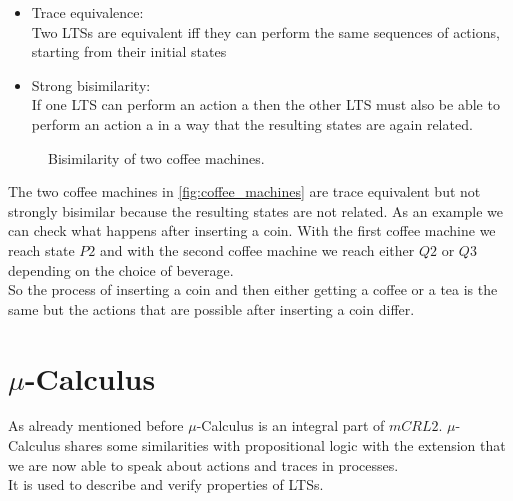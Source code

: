\documentclass{clseminar}
\begin{document}
  \begin{itemize}[noitemsep]
    \item Trace equivalence: \\
    Two LTSs are equivalent iff they can perform the same sequences of actions, starting from their initial states \\
    \item Strong bisimilarity: \\
    If one LTS can perform an action a then the other LTS must also be able to perform an action a in a way that the resulting states are again related. \\
  \end{itemize}

  \begin{figure}[!ht]
    \resizebox{\textwidth}{!}{}
    \caption{Bisimilarity of two coffee machines.}
    \label{fig:coffee_machines}
  \end{figure}

  The two coffee machines in \autoref{fig:coffee_machines} are trace equivalent but not strongly bisimilar because the resulting states are not related. As an example we can check what happens after inserting a coin. With the first coffee machine we reach state $P2$ and with the second coffee machine we reach either $Q2$ or $Q3$ depending on the choice of beverage.\\
  So the process of inserting a coin and then either getting a coffee or a tea is the same but the actions that are possible after inserting a coin differ.

  \section{$\mu$-Calculus}
  As already mentioned before $\mu$-Calculus is an integral part of $mCRL2$. $\mu$-Calculus shares some similarities with propositional logic with the extension that we are now able to speak about actions and traces in processes. \\
  It is used to describe and verify properties of LTSs.
\end{document}
